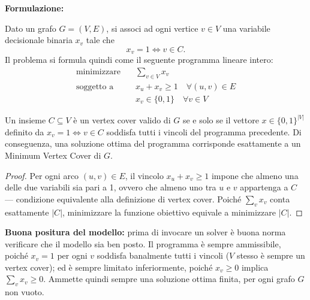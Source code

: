 \textbf{Formulazione:}

\begin{definiz}
Dato un grafo $G=(V,E)$, si associ ad ogni vertice $v \in V$ una variabile decisionale binaria $x_v$ tale che
\[
x_v = 1 \iff v \in C.
\]
Il problema si formula quindi come il seguente programma lineare intero:
\begin{align*}
\text{minimizzare} \quad & \sum_{v \in V} x_v \\
\text{soggetto a} \quad & x_u + x_v \geq 1 \quad \forall (u,v) \in E \\
& x_v \in \{0,1\} \quad \forall v \in V
\end{align*}
\end{definiz}

\begin{teorema} \label{ilp-equiv}
Un insieme $C \subseteq V$ è un vertex cover valido di $G$ se e solo se il vettore $x \in \{0,1\}^{|V|}$ definito da $x_v = 1 \iff v \in C$ soddisfa tutti i vincoli del programma precedente. Di conseguenza, una soluzione ottima del programma corrisponde esattamente a un Minimum Vertex Cover di $G$.
\end{teorema}

\begin{proof}
Per ogni arco $(u,v) \in E$, il vincolo $x_u + x_v \geq 1$ impone che almeno una delle due variabili sia pari a 1, ovvero che almeno uno tra $u$ e $v$ appartenga a $C$ — condizione equivalente alla definizione di vertex cover. Poiché $\sum_v x_v$ conta esattamente $|C|$, minimizzare la funzione obiettivo equivale a minimizzare $|C|$.
\end{proof}

\textbf{Buona positura del modello:} prima di invocare un solver è buona norma verificare che il modello sia ben posto. Il programma è sempre ammissibile, poiché $x_v = 1$ per ogni $v$ soddisfa banalmente tutti i vincoli ($V$ stesso è sempre un vertex cover); ed è sempre limitato inferiormente, poiché $x_v \geq 0$ implica $\sum_v x_v \geq 0$. Ammette quindi sempre una soluzione ottima finita, per ogni grafo $G$ non vuoto.
